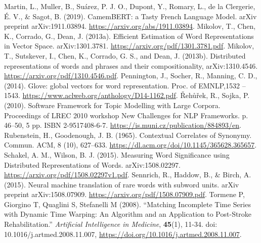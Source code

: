 \documentclass[11pt,french,french]{article}
\begin{document}
\begin{thebibliography}{999}
 Martin, L., Muller, B., Suárez, P. J. O., Dupont, Y., Romary, L., de la Clergerie, É. V., \& Sagot, B. (2019). CamemBERT: a Tasty French Language Model. arXiv preprint arXiv:1911.03894. \url{https://arxiv.org/abs/1911.03894}.
 Mikolov, T., Chen, K., Corrado, G., Dean, J. (2013a). Efficient Estimation of Word Representations in Vector Space. arXiv:1301.3781. \url{https://arxiv.org/pdf/1301.3781.pdf}.
 Mikolov, T., Sutskever, I., Chen, K., Corrado, G. S., and Dean, J. (2013b). Distributed representations of words and phrases and their compositionality, arXiv:1310.4546. \url{https://arxiv.org/pdf/1310.4546.pdf}.
 Pennington, J., Socher, R., Manning, C. D., (2014).  Glove: global vectors for word representation. Proc. of EMNLP,1532 – 1543. \url{https://www.aclweb.org/anthology/D14-1162.pdf}.
 {\v R}eh{\r u}{\v r}ek, R., Sojka, P. (2010). Software Framework for Topic Modelling with Large Corpora. Proceedings of LREC 2010 workshop New Challenges for NLP Frameworks. p. 46--50, 5 pp. ISBN 2-9517408-6-7. \url{https://is.muni.cz/publication/884893/en}.
 Rubenstein, H., Goodenough, J. B. (1965). Contextual Correlates of Synonymy. Commun. ACM, 8 (10), 627–633. \url{https://dl.acm.org/doi/10.1145/365628.365657}.
 Schakel, A. M., Wilson, B. J. (2015). Measuring Word Significance using Distributed Representations of Words. arXiv:1508.02297. \url{https://arxiv.org/pdf/1508.02297v1.pdf}.
 Sennrich, R., Haddow, B., \& Birch, A. (2015). Neural machine translation of rare words with subword units. arXiv preprint arXiv:1508.07909. \url{https://arxiv.org/pdf/1508.07909.pdf}.
 Tormene P, Giorgino T, Quaglini S, Stefanelli M (2008). “Matching
Incomplete Time Series with Dynamic Time Warping: An Algorithm and an Application to Post-Stroke Rehabilitation.” \emph{Artificial Intelligence
in Medicine}, \textbf{45}(1), 11-34. doi: 10.1016/j.artmed.2008.11.007, \url{https://doi.org/10.1016/j.artmed.2008.11.007}.
\end{thebibliography}
\end{document}

